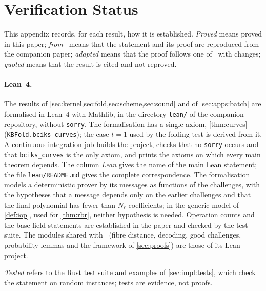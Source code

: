 \section{Verification Status}\label{app:verification}

This appendix records, for each result, how it is established.
\emph{Proved} means proved in this paper; \emph{from~\cite{Mkh26}} means that the statement and its proof are reproduced from the companion paper; \emph{adapted} means that the proof follows one of~\cite{Mkh26} with changes; \emph{quoted} means that the result is cited and not reproved.

\paragraph{Lean~4.}
The results of \cref{sec:kernel,sec:fold,sec:scheme,sec:sound} and of \cref{sec:apps:batch} are formalised in Lean~4 with Mathlib, in the directory \texttt{lean/} of the companion repository, without \texttt{sorry}.
The formalisation has a single axiom, \cref{thm:curves} (\texttt{KBFold.bciks\_curves}); the case $t = 1$ used by the folding test is derived from it.
A continuous-integration job builds the project, checks that no \texttt{sorry} occurs and that \texttt{bciks\_curves} is the only axiom, and prints the axioms on which every main theorem depends.
The column \emph{Lean} gives the name of the main Lean statement; the file \texttt{lean/README.md} gives the complete correspondence.
The formalisation models a deterministic prover by its messages as functions of the challenges, with the hypotheses that a message depends only on the earlier challenges and that the final polynomial has fewer than $N_\ell$ coefficients; in the generic model of \cref{def:iop}, used for \cref{thm:rbr}, neither hypothesis is needed.
Operation counts and the base-field statements are established in the paper and checked by the test suite.
The modules shared with~\cite{Mkh26} (fibre distance, decoding, good challenges, probability lemmas and the framework of \cref{sec:proofs}) are those of its Lean project.

\emph{Tested} refers to the Rust test suite and examples of \cref{sec:impl:tests}, which check the statement on random instances; tests are evidence, not proofs.

